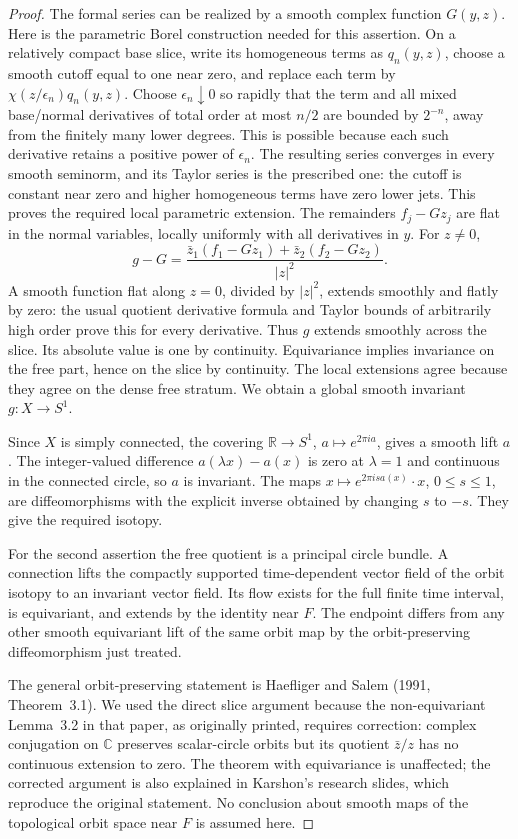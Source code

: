 \begin{proof}
The formal series can be realized by a smooth complex function
\(G(y,z)\). Here is the parametric Borel construction needed for
this assertion. On a relatively compact base slice, write its
homogeneous terms as \(q_n(y,z)\), choose a smooth cutoff equal to
one near zero, and replace each term by
\(\chi(z/\epsilon_n)q_n(y,z)\). Choose
\(\epsilon_n\downarrow0\) so rapidly that the term and all
mixed base/normal derivatives of total order at most \(n/2\)
are bounded by \(2^{-n}\), away from the finitely many lower
degrees. This is possible because each such derivative retains a
positive power of \(\epsilon_n\). The resulting series converges
in every smooth seminorm, and its Taylor series is the prescribed
one: the cutoff is constant near zero and higher homogeneous
terms have zero lower jets. This proves the required local
parametric extension. The remainders
\(f_j-Gz_j\) are flat in the normal variables, locally uniformly
with all derivatives in \(y\). For \(z\ne0\),
\[
 g-G=\frac{\bar z_1(f_1-Gz_1)+\bar z_2(f_2-Gz_2)}{|z|^2}.
\]
A smooth function flat along \(z=0\), divided by \(|z|^2\),
extends smoothly and flatly by zero: the usual quotient derivative
formula and Taylor bounds of arbitrarily high order prove this for
every derivative. Thus \(g\) extends smoothly across the slice.
Its absolute value is one by continuity. Equivariance implies
invariance on the free part, hence on the slice by continuity.
The local extensions agree because they agree on the dense free
stratum. We obtain a global smooth invariant \(g:X\to S^1\).

Since \(X\) is simply connected, the covering
\(\mathbb R\to S^1\), \(a\mapsto e^{2\pi ia}\), gives a smooth
lift \(a\). The integer-valued difference
\(a(\lambda x)-a(x)\) is zero at \(\lambda=1\) and continuous
in the connected circle, so \(a\) is invariant. The maps
\(x\mapsto e^{2\pi isa(x)}\cdot x\), \(0\leq s\leq1\),
are diffeomorphisms with the explicit inverse obtained by changing
\(s\) to \(-s\). They give the required isotopy.

For the second assertion the free quotient is a principal circle
bundle. A connection lifts the compactly supported time-dependent
vector field of the orbit isotopy to an invariant vector field.
Its flow exists for the full finite time interval, is equivariant,
and extends by the identity near \(F\). The endpoint differs from
any other smooth equivariant lift of the same orbit map by the
orbit-preserving diffeomorphism just treated.

The general orbit-preserving statement is Haefliger and Salem
(1991, Theorem~3.1). We used the direct slice argument because the
non-equivariant Lemma~3.2 in that paper, as originally printed,
requires correction: complex conjugation on \(\mathbb C\)
preserves scalar-circle orbits but its quotient
\(\bar z/z\) has no continuous extension to zero. The theorem
with equivariance is unaffected; the corrected argument is also
explained in Karshon's research slides, which reproduce the original
statement. No conclusion about smooth maps of the topological orbit
space near \(F\) is assumed here.
\nocite{HaefligerSalem1991D,KarshonOrbitSlidesD}
\end{proof}
